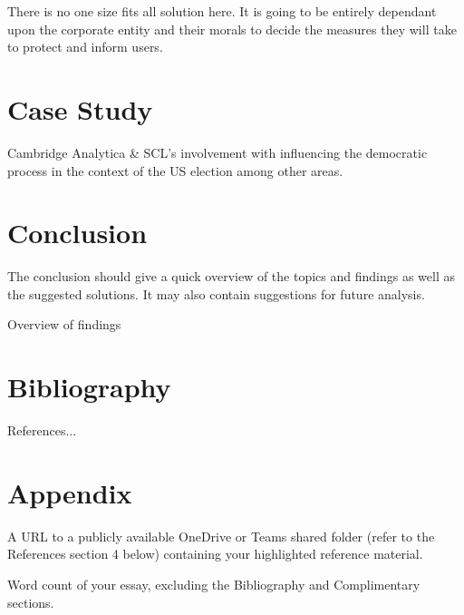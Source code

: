\documentclass[12pt,a4paper]{article}
\begin{document}
There is no one size fits all solution here. It is going to be entirely dependant upon the corporate entity and their morals to decide the measures they will take to protect and inform users.




\section{Case Study}

Cambridge Analytica & SCL's involvement with influencing the democratic process in the context of the US election among other areas.


 


\section{Conclusion}

The conclusion should give a quick overview of the topics and findings as well as the suggested solutions. It may also contain suggestions for future analysis.

Overview of findings


\section{Bibliography}

References...


\section{Appendix}

A URL to a publicly available OneDrive or Teams shared folder (refer to the References section 4 below) containing your highlighted reference material.

Word count of your essay, excluding the Bibliography and Complimentary sections.

\end{document}
